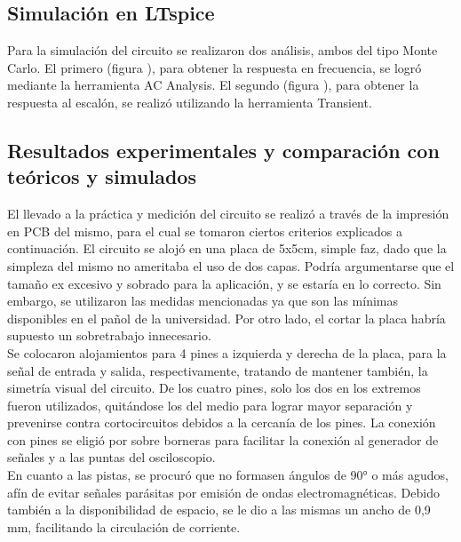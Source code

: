 \subsection{Simulaci\'on en LTspice}
Para la simulaci\'on del circuito se realizaron dos an\'alisis, ambos del tipo Monte Carlo.
El primero (figura ), para obtener la respuesta en frecuencia, se logr\'o mediante la herramienta AC Analysis.
El segundo (figura ), para obtener la respuesta al escal\'on, se realiz\'o utilizando la herramienta Transient.




\subsection{Resultados experimentales y comparaci\'on con te\'oricos y simulados}
El llevado a la pr\'actica y medici\'on del circuito se realiz\'o a trav\'es de la impresi\'on en PCB del mismo, para el cual se tomaron ciertos criterios explicados a continuaci\'on.
El circuito se aloj\'o en una placa de 5x5cm, simple faz, dado que la simpleza del mismo no ameritaba el uso de dos capas.
Podr\'ia argumentarse que el tama\~no ex excesivo y sobrado para la aplicaci\'on, y se estar\'ia en lo correcto.
Sin embargo, se utilizaron las medidas mencionadas ya que son las m\'inimas disponibles en el pa\~nol de la universidad.
Por otro lado, el cortar la placa habr\'ia supuesto un sobretrabajo innecesario. \\
Se colocaron alojamientos para 4 pines a izquierda y derecha de la placa, para la se\~nal de entrada y salida, respectivamente, tratando de mantener tambi\'en, la simetr\'ia visual del circuito.
De los cuatro pines, solo los dos en los extremos fueron utilizados, quit\'andose los del medio para lograr mayor separaci\'on y prevenirse contra cortocircuitos debidos a la cercan\'ia de los pines.
La conexi\'on con pines se eligi\'o por sobre borneras para facilitar la conexi\'on al generador de se\~nales y a las puntas del osciloscopio.\\
En cuanto a las pistas, se procur\'o que no formasen \'angulos de 90° o m\'as agudos, af\'in de evitar se\~nales par\'asitas por emisi\'on de ondas electromagn\'eticas.
Debido tambi\'en a la disponibilidad de espacio, se le dio a las mismas un ancho de 0,9 mm, facilitando la circulaci\'on de corriente.\\
